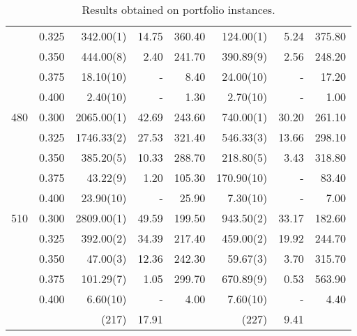 \begin{table}[Hp]
\begin{center}
\begin{tabular}{rr|rrr|rrr}
	&	0.325	&		342.00(1)	&	14.75	&	360.40	&		124.00(1)	&	5.24	&	375.80	\\
	&	0.350	&		444.00(8)	&	2.40	&	241.70	&		390.89(9)	&	2.56	&	248.20	\\
	&	0.375	&		18.10(10)	&	-	&	8.40	&		24.00(10)	&	-	&	17.20	\\
	&	0.400	&		2.40(10)	&	-	&	1.30	&		2.70(10)	&	-	&	1.00	\\
\hline
480	&	0.300	&		2065.00(1)	&	42.69	&	243.60	&		740.00(1)	&	30.20	&	261.10	\\
	&	0.325	&		1746.33(2)	&	27.53	&	321.40	&		546.33(3)	&	13.66	&	298.10	\\
	&	0.350	&		385.20(5)	&	10.33	&	288.70	&		218.80(5)	&	3.43	&	318.80	\\
	&	0.375	&		43.22(9)	&	1.20	&	105.30	&		170.90(10)	&	-	&	83.40	\\
	&	0.400	&		23.90(10)	&	-	&	25.90	&		7.30(10)	&	-	&	7.00	\\
\hline
510	&	0.300	&		2809.00(1)	&	49.59	&	199.50	&		943.50(2)	&	33.17	&	182.60	\\
	&	0.325	&		392.00(2)	&	34.39	&	217.40	&		459.00(2)	&	19.92	&	244.70	\\
	&	0.350	&		47.00(3)	&	12.36	&	242.30	&		59.67(3)	&	3.70	&	315.70	\\
	&	0.375	&		101.29(7)	&	1.05	&	299.70	&		670.89(9)	&	0.53	&	563.90	\\
	&	0.400	&		6.60(10)	&	-	&	4.00	&		7.60(10)	&	-	&	4.40	\\
\hline
	&		&		(217)	&	17.91	&		&		(227)	&	9.41	&		\\
\hline
\end{tabular}
\end{center}
\caption{\footnotesize Results obtained on portfolio instances.}
\label{resBC_EconomyInstnaces}
\normalsize
\end{table}

